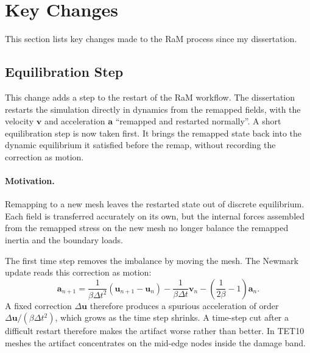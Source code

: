 \section{Key Changes}

This section lists key changes made to the RaM process since my dissertation. 

\subsection{Equilibration Step}\label{ss:equilibration}

This change adds a step to the restart of the RaM workflow. The dissertation restarts the simulation directly in dynamics from the remapped fields, with the velocity $\mathbf{v}$ and acceleration $\mathbf{a}$ ``remapped and restarted normally''. A short equilibration step is now taken first. It brings the remapped state back into the dynamic equilibrium it satisfied before the remap, without recording the correction as motion.

\paragraph{Motivation.}
Remapping to a new mesh leaves the restarted state out of discrete equilibrium. Each field is transferred accurately on its own, but the internal forces assembled from the remapped stress on the new mesh no longer balance the remapped inertia and the boundary loads. 

The first time step removes the imbalance by moving the mesh. The Newmark update reads this correction as motion:
\begin{equation}
    \mathbf{a}_{n+1} = \frac{1}{\beta\Delta t^2}\left(\mathbf{u}_{n+1}-\mathbf{u}_n\right) - \frac{1}{\beta\Delta t}\mathbf{v}_n - \left(\frac{1}{2\beta}-1\right)\mathbf{a}_n.\label{eq:newmark_accel}
\end{equation}
A fixed correction $\Delta\mathbf{u}$ therefore produces a spurious acceleration of order $\Delta\mathbf{u}/(\beta\Delta t^2)$, which grows as the time step shrinks. A time-step cut after a difficult restart therefore makes the artifact worse rather than better. In TET10 meshes the artifact concentrates on the mid-edge nodes inside the damage band. 

